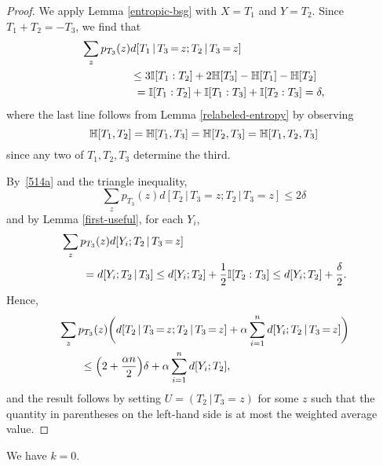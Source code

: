 \begin{proof}
  We apply Lemma \ref{entropic-bsg} with $X=T_1$ and $Y=T_2$.
  Since $T_1+T_2=-T_3$, we find that
  \begin{align}\nonumber
    \sum_{z} p_{T_3}(z) & d[T_1 \,|\, T_3 \mathop{=} z;T_2 \,|\, T_3 \mathop{=} z] \\ \nonumber
    &\leq  3 \mathbb{I}[T_1 : T_2] + 2 \mathbb{H}[T_3] - \mathbb{H}[T_1] - \mathbb{H}[T_2] \\
    &\ = \mathbb{I}[T_1 : T_2] + \mathbb{I}[T_1 : T_3] + \mathbb{I}[T_2 : T_3]
    = \delta,\label{514a}
  \end{align}
  where the last line follows from Lemma \ref{relabeled-entropy} by observing
  \[
    \mathbb{H}[T_1,T_2] = \mathbb{H}[T_1,T_3] = \mathbb{H}[T_2,T_3] = \mathbb{H}[T_1,T_2,T_3]
  \]
  since any two of $T_1,T_2,T_3$ determine the third.

  By~\eqref{514a} and the triangle inequality,
  \[
    \sum_z p_{T_3}(z) d[T_2 \,|\, T_3 \mathop{=} z; T_2 \,|\, T_3\mathop{=}z] \leq 2 \delta
  \]
  and by Lemma \ref{first-useful}, for each $Y_i$,
  \begin{align*}
    &\sum_z p_{T_3}(z) d[Y_i; T_2 \,|\, T_3 \mathop{=} z] \\
    &\qquad= d[Y_i; T_2 \,|\, T_3]
                                    \leq d[Y_i;T_2] + \frac12 \mathbb{I}[T_2 : T_3]
                                    \leq d[Y_i;T_2] + \frac{\delta}{2}.
  \end{align*}
  Hence,
  \begin{align*}
    &\sum_z p_{T_3}(z) \bigg( d[T_2 \,|\, T_3 \mathop{=} z; T_2 \,|\, T_3 \mathop{=} z] + \alpha \sum_{i=1}^n d[Y_i;T_2 \,|\, T_3 \mathop{=} z] \bigg) \\
    &\qquad \leq
    \Bigl(2 + \frac{\alpha n}{2} \Bigr) \delta + \alpha \sum_{i=1}^n d[Y_i; T_2],
  \end{align*}
  and the result follows by setting $U=(T_2 \,|\, T_3 \mathop{=} z)$ for some $z$ such that the quantity in parentheses on the left-hand side is at most the weighted average value.
\end{proof}

\begin{proposition}\label{k-vanish}  We have $k = 0$.
\end{proposition}

